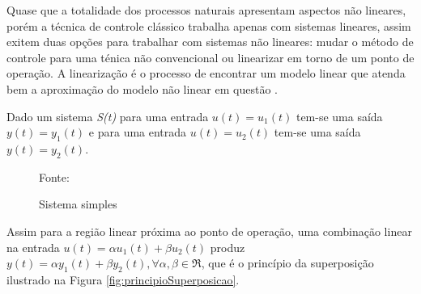 Quase que a totalidade dos processos naturais apresentam aspectos não lineares, porém a técnica de controle clássico trabalha apenas com sistemas lineares, assim exitem duas opções para trabalhar com sistemas não lineares: mudar o método de controle para uma ténica não convencional ou linearizar em torno de um ponto de operação. 
A linearização é o processo de encontrar um modelo linear que atenda bem a aproximação do modelo não linear em questão \cite{Ogata}.


Dado um sistema \emph{S(t)} para uma entrada $u(t) = u_1(t)$ tem-se uma saída $y(t) = y_1(t)$ e para uma entrada $u(t) = u_2(t)$ tem-se uma saída $y(t) = y_2(t)$.

\begin{figure}[!htb]
\centering
\caption{ Sistema simples}
\label{fig:sistemaSimples}

{\small Fonte: \cite{Ogata}}
\end{figure}

Assim para a região linear próxima ao ponto de operação, uma combinação linear na entrada $u(t) = \alpha u_1(t) + \beta u_2(t)$ produz $y(t) = \alpha y_1(t) + \beta y_2(t), \forall \alpha ,  \beta \in \Re $, que é o princípio da superposição ilustrado na Figura \ref{fig:principioSuperposicao}.



